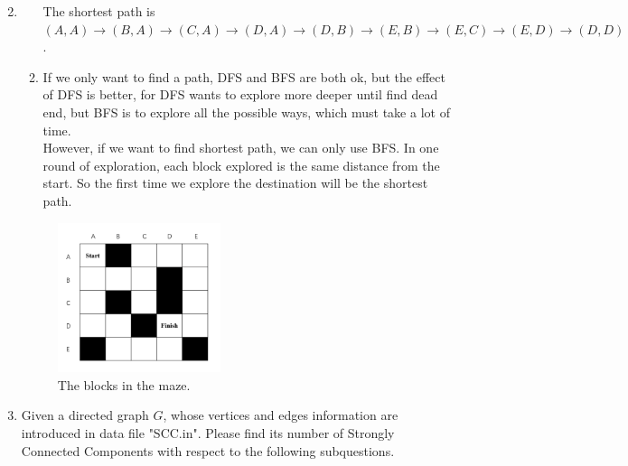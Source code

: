 \documentclass[12pt,a4paper]{article}
\makeatletter
\newtheorem*{solution}{Solution}
\theoremstyle{definition}
\renewenvironment{solution}[1][Solution] {\par\pushQED{\qed}\normalfont\topsep6\p@\@plus6\p@\relax\trivlist\item[\hskip\labelsep\bfseries#1\@addpunct{.}]\ignorespaces}{\popQED\endtrivlist\@endpefalse} \makeatother
\makeatother
\begin{document}
\begin{enumerate}
\begin{solution}
\begin{enumerate}
        The shortest path is $(A,A)\rightarrow(B,A)\rightarrow(C,A)\rightarrow(D,A)\rightarrow(D,B)\rightarrow(E,B)\rightarrow(E,C)\rightarrow(E,D)\rightarrow(D,D)$.
        \item If we only want to find a path, DFS and BFS are both ok, but the effect of DFS is better, for DFS wants to explore more deeper until find dead end, but BFS is to explore all the possible ways, which must take a lot of time.\\
        However, if we want to find shortest path, we can only use BFS. In one round of exploration, each block explored is the same distance from the start. So the first time we explore the destination will be the shortest path. 
    \end{enumerate}
    \end{solution}
    \begin{figure}[!htbp]
	\centering
	\includegraphics[width=0.45\textwidth]{Fig-Maze.pdf}
	\caption{The blocks in the maze.}
	\label{Fig-Maze}
	\end{figure}
	
	\item Given a directed graph $G$, whose vertices and edges information are introduced in data file "SCC.in". Please find its number of Strongly Connected Components with respect to the following subquestions.
    

\end{enumerate}
\end{document}
